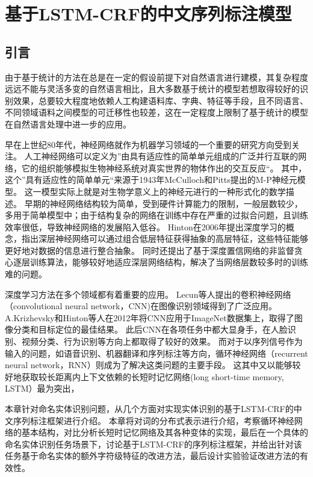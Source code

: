 \chapter{基于LSTM-CRF的中文序列标注模型}
\section{引言}
由于基于统计的方法在总是在一定的假设前提下对自然语言进行建模，其复杂程度远远不能与灵活多变的自然语言相比，且大多数基于统计的模型若想取得较好的识别效果，总要较大程度地依赖人工构建语料库、字典、特征等手段，且不同语言、不同领域语料之间模型的可迁移性也较差，这在一定程度上限制了基于统计的模型在自然语言处理中进一步的应用。

早在上世纪80年代，神经网络就作为机器学习领域的一个重要的研究方向受到关注。
人工神经网络可以定义为”由具有适应性的简单单元组成的广泛并行互联的网络，它的组织能够模拟生物神经系统对真实世界的物体作出的交互反应“。
其中，这个”具有适应性的简单单元“来源于1943年McCulloch和Pitts提出的M-P神经元模型。
这一模型实际上就是对生物学意义上的神经元进行的一种形式化的数学描述。
早期的神经网络结构较为简单，受到硬件计算能力的限制，一般层数较少，多用于简单模型中；由于结构复杂的网络在训练中存在严重的过拟合问题，且训练效率很低，导致神经网络的发展陷入低谷。
Hinton在2006年提出深度学习的概念，指出深层神经网络可以通过组合低层特征获得抽象的高层特征，这些特征能够更好地对数据的信息进行整合抽象。
同时还提出了基于深度置信网络的非监督贪心逐层训练算法，能够较好地适应深层网络结构，解决了当网络层数较多时的训练难的问题。

深度学习方法在多个领域都有着重要的应用。
Lecun等人提出的卷积神经网络（convolutional neural network，CNN)在图像识别领域得到了广泛应用。
A.Krizhevsky和Hinton等人在2012年将CNN应用于ImageNet数据集上，取得了图像分类和目标定位的最佳结果。
此后CNN在各项任务中都大显身手，在人脸识别、视频分类、行为识别等方向上都取得了较好的效果。
而对于以序列信号作为输入的问题，如语音识别、机器翻译和序列标注等方向，循环神经网络（recurrent neural network，RNN）则成为了解决这类问题的主要手段。
这其中又以能够较好地获取较长距离内上下文依赖的长短时记忆网络(long short-time memory, LSTM）最为突出，

本章针对命名实体识别问题，从几个方面对实现实体识别的基于LSTM-CRF的中文序列标注框架进行介绍。
本章将对词的分布式表示进行介绍，考察循环神经网络的基本结构，对比分析长短时记忆网络及其各种变体的实现，最后在一个具体的命名实体识别任务场景下，讨论基于LSTM-CRF的序列标注框架，并给出针对该任务基于命名实体的额外字符级特征的改进方法，最后设计实验验证改进方法的有效性。

